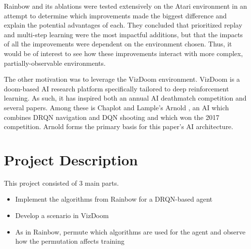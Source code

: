 \documentclass[letterpaper]{article}
\begin{document}
	Rainbow and its ablations were tested extensively on the Atari environment in an attempt to determine which improvements made the biggest difference and explain the potential advantages of each. They concluded that prioritized replay and multi-step learning were the most impactful additions, but that the impacts of all the improvements were dependent on the environment chosen. Thus, it would be of interest to see how these improvements interact with more complex, partially-observable environments. 
	
	The other motivation was to leverage the VizDoom environment. VizDoom is a doom-based AI research platform specifically tailored to deep reinforcement learning\cite{kempka2016vizdoom}. As such, it has inspired both an annual AI deathmatch competition\cite{wydmuch2018vizdoom} and several papers. Among these is Chaplot and Lample's Arnold \cite{chaplot2017arnold}, an AI which combines DRQN navigation and DQN shooting and which won the 2017 competition. Arnold forms the primary basis for this paper's AI architecture.
	
	\section{Project Description}
	
	This project consisted of 3 main parts.
	\begin{itemize}
		\item Implement the algorithms from Rainbow for a DRQN-based agent
		\item Develop a scenario in VizDoom 
		\item As in Rainbow, permute which algorithms are used for the agent and observe how the permutation affects training
	\end{itemize}
\end{document}
